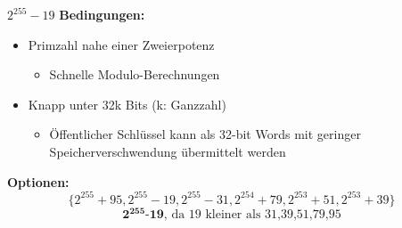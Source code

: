 \begin{frame}{$2^{255}-19$}
\textbf{Bedingungen:}
    \begin{itemize}
        \item Primzahl nahe einer Zweierpotenz
        \begin{itemize}
            \item Schnelle Modulo-Berechnungen
        \end{itemize}
        \item Knapp unter 32k Bits (k: Ganzzahl)
            \begin{itemize}
                \item Öffentlicher Schlüssel kann als 32-bit Words mit geringer Speicherverschwendung übermittelt werden
            \end{itemize}
    \end{itemize}
\textbf{Optionen:}
\[\{2^{255}+95,2^{255}-19,2^{255}-31, 2^{254}+79,2^{253}+51, 2^{253}+39\}\]
\[\textbf{2$^{\textbf{255}}$-19}\text{, da 19 kleiner als 31,39,51,79,95}\]
\end{frame}
